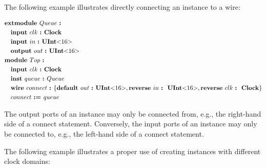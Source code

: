 \documentclass[12pt]{article}
\begin{document}
The following example illustrates directly connecting an instance to a wire:

{ \fontsize{11pt}{1.15em}\selectfont
\[
\begin{aligned}
&\kw{extmodule} Queue \ \kws{:} \\
&\quad \kw{input} clk  \ \kw{:} \kws{Clock} \\
&\quad \kw{input} in   \ \kw{:} \kws{UInt$<$}16\kws{$>$} \\
&\quad \kw{output} out \ \kw{:} \kws{UInt$<$}16\kws{$>$} \\
&\kw{module} Top \ \kws{:} \\
&\quad \kw{input} clk  \ \kw{:} \kws{Clock} \\
&\quad \kw{inst} queue \ \kw{:} Queue \\
&\quad \kw{wire} connect \ \kw{:} \bundleT{\kw{default} out \ \kw{:} \kws{UInt$<$}16\kws{$>$},\kw{reverse} in \ \kw{:} \ \kws{UInt$<$}16\kws{$>$},\kw{reverse} clk \ \kw{:} \ \kws{Clock}} \\
&\quad connect \ \kw{:=} queue \\
\end{aligned}
\]
}

The output ports of an instance may only be connected from, e.g., the right-hand side of a connect statement.
Conversely, the input ports of an instance may only be connected to, e.g., the left-hand side of a connect statement.

The following example illustrates a proper use of creating instances with different clock domains:
\end{document}
